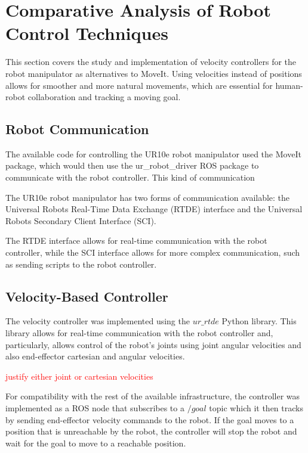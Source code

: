 \section{Comparative Analysis of Robot Control Techniques}
\label{section:robot_control_techniques}

This section covers the study and implementation of velocity controllers for the robot manipulator as alternatives to MoveIt. Using velocities instead of positions allows for smoother and more natural movements, which are essential for human-robot collaboration and tracking a moving goal.

\subsection{Robot Communication}

The available code for controlling the UR10e robot manipulator used the MoveIt package, which would then use the ur\_robot\_driver ROS package to communicate with the robot controller. This kind of communication

The UR10e robot manipulator has two forms of communication available: the Universal Robots Real-Time Data Exchange (RTDE) interface and the Universal Robots Secondary Client Interface (SCI).

The RTDE interface allows for real-time communication with the robot controller, while the SCI interface allows for more complex communication, such as sending scripts to the robot controller.

\subsection{Velocity-Based Controller}

The velocity controller was implemented using the $ur\_rtde$ Python library. This library allows for real-time communication with the robot controller and, particularly, allows control of the robot's joints using joint angular velocities and also end-effector cartesian and angular velocities.

\textcolor{red}{justify either joint or cartesian velocities}

For compatibility with the rest of the available infrastructure, the controller was implemented as a ROS node that subscribes to a $/goal$ topic which it then tracks by sending end-effector velocity commands to the robot. If the goal moves to a position that is unreachable by the robot, the controller will stop the robot and wait for the goal to move to a reachable position.

